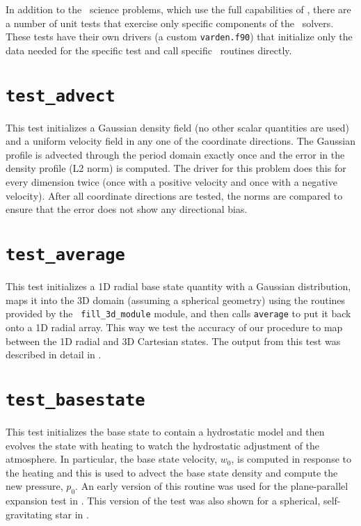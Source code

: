 
\label{chapter:unit_tests}

In addition to the \maestro\ science problems, which use the full
capabilities of \maestro, there are a number of unit tests that
exercise only specific components of the \maestro\ solvers.  These
tests have their own drivers (a custom {\tt varden.f90}) that
initialize only the data needed for the specific test and call
specific \maestro\ routines directly.


\section {\tt test\_advect}

  This test initializes a Gaussian density field (no other scalar
  quantities are used) and a uniform velocity field in any one of the
  coordinate directions.  The Gaussian profile is advected through
  the period domain exactly once and the error in the density profile
  (L2 norm) is computed.  The driver for this problem does this 
  for every dimension twice (once with a positive velocity and once
  with a negative velocity).  After all coordinate directions are 
  tested, the norms are compared to ensure that the error does
  not show any directional bias.


\section {\tt test\_average} 

  This test initializes a 1D radial base state quantity with a
  Gaussian distribution, maps it into the 3D domain (assuming a
  spherical geometry) using the routines provided by the {\tt
    fill\_3d\_module} module, and then calls {\tt average} to put it
  back onto a 1D radial array.  This way we test the accuracy of our
  procedure to map between the 1D radial and 3D Cartesian states.
  The output from this test was described in detail in
  \cite{multilevel}.


\section {\tt test\_basestate} 

  This test initializes the base state to contain a hydrostatic
  model and then evolves the state with heating to watch the 
  hydrostatic adjustment of the atmosphere.  In particular,
  the base state velocity, $w_0$, is computed in response to 
  the heating and this is used to advect the base state density
  and compute the new pressure, $p_0$.  An early version of 
  this routine was used for the plane-parallel expansion test
  in \cite{lowMach2}.  This version of the test was also shown
  for a spherical, self-gravitating star in \cite{multilevel}.

